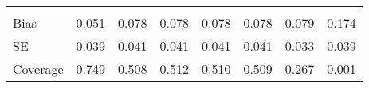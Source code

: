 \begin{table}
\begin{tabular}{lddddddd}
\addlinespace[0.3em]
\\
\hspace{1em}Bias & 0.051 & 0.078 & 0.078 & 0.078 & 0.078 & 0.079 & 0.174\\
\hspace{1em}SE & 0.039 & 0.041 & 0.041 & 0.041 & 0.041 & 0.033 & 0.039\\
\hspace{1em}Coverage & 0.749 & 0.508 & 0.512 & 0.510 & 0.509 & 0.267 & 0.001\\
\bottomrule
\end{tabular}
\end{table}
